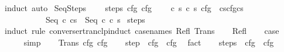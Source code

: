 \begin{isabellebody}
\isamarkupfalse%
\ {\isacharparenleft}induct{\isacharparenright}\ auto%
\endisatagproof
{\isafoldproof}%
%
\isadelimproof
\isanewline
%
\endisadelimproof
\isanewline
{}\isamarkupfalse%
\ SeqSteps{\isacharcolon}\ \isanewline
\ \ \ steps{\isacharcolon}\ {\isachardoublequoteopen}{\isasymGamma}{\isasymturnstile}cfg\isactrlsup {\isacharasterisk}\ cfg\isanewline
\ \ \ {\isachardoublequoteopen}{\isasymAnd}\ c\ s\ c\ s{\isacharprime}{\isachardot}\ {\isasymlbrakk}cfg\ {\isacharequal}\ {\isacharparenleft}cs{\isacharparenright}{\isacharsemicolon}cfgcs{\isacharprime}{\isacharparenright}{\isasymrbrakk}\isanewline
\ \ \ \ \ \ \ \ \ \ {\isasymLongrightarrow}\ {\isasymGamma}{\isasymturnstile}{\isacharparenleft}Seq\ c\ cs{\isacharparenright}\ {\isasymrightarrow}\isactrlsup {\isacharasterisk}\ {\isacharparenleft}Seq\ c\ c\ s{\isacharprime}{\isacharparenright}{\isachardoublequoteclose}\isanewline
%
\isadelimproof
%
\endisadelimproof
%
\isatagproof
{}\isamarkupfalse%
\ steps\isanewline
{}\isamarkupfalse%
\ {\isacharparenleft}induct\ rule{\isacharcolon}\ converse{\isacharunderscore}rtranclp{\isacharunderscore}induct\ {\isacharbrackleft}case{\isacharunderscore}names\ Refl\ Trans{\isacharbrackright}{\isacharparenright}\isanewline
\ \ \isamarkupfalse%
\ Refl\isanewline
\ \ \isamarkupfalse%
\ {\isacharquery}case\isanewline
\ \ \ \ \isamarkupfalse%
\ simp\isanewline
{}\isamarkupfalse%
\isanewline
\ \ \isamarkupfalse%
\ {\isacharparenleft}Trans\ cfg\ cfg{\isacharprime}{\isacharprime}{\isacharparenright}\isanewline
\ \ \isamarkupfalse%
\ step{\isacharcolon}\ {\isachardoublequoteopen}{\isasymGamma}{\isasymturnstile}\ cfg\ {\isasymrightarrow}\ cfg{\isacharprime}{\isacharprime}{\isachardoublequoteclose}\ \isamarkupfalse%
\ fact\isanewline
\ \ \isamarkupfalse%
\ steps{\isacharcolon}\ {\isachardoublequoteopen}{\isasymGamma}{\isasymturnstile}\ cfg{\isacharprime}{\isacharprime}\ {\isasymrightarrow}\isactrlsup {\isacharasterisk}\ cfg\ \isamarkupfalse%

\end{isabellebody}
